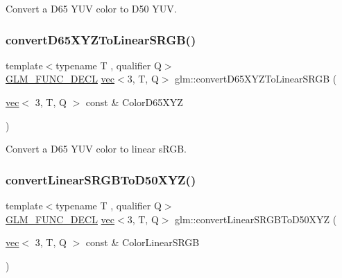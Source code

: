 Convert a D65 Y\+UV color to D50 Y\+UV. 

\mbox{\label{group__gtx__color__encoding_ga5265386fc3ac29e4c580d37ed470859c}} 
\subsubsection{\texorpdfstring{convert\+D65\+X\+Y\+Z\+To\+Linear\+S\+R\+G\+B()}{convertD65XYZToLinearSRGB()}}
{\footnotesize\ttfamily template$<$typename T , qualifier Q$>$ \\
\mbox{\hyperlink{setup_8hpp_ab2d052de21a70539923e9bcbf6e83a51}{G\+L\+M\+\_\+\+F\+U\+N\+C\+\_\+\+D\+E\+CL}} \mbox{\hyperlink{structglm_1_1vec}{vec}}$<$3, T, Q$>$ glm\+::convert\+D65\+X\+Y\+Z\+To\+Linear\+S\+R\+GB (\begin{DoxyParamCaption}\item[{\mbox{\hyperlink{structglm_1_1vec}{vec}}$<$ 3, T, Q $>$ const \&}]{Color\+D65\+X\+YZ }\end{DoxyParamCaption})}



Convert a D65 Y\+UV color to linear s\+R\+GB. 

\mbox{\label{group__gtx__color__encoding_ga1522ba180e3d83d554a734056da031f9}} 
\subsubsection{\texorpdfstring{convert\+Linear\+S\+R\+G\+B\+To\+D50\+X\+Y\+Z()}{convertLinearSRGBToD50XYZ()}}
{\footnotesize\ttfamily template$<$typename T , qualifier Q$>$ \\
\mbox{\hyperlink{setup_8hpp_ab2d052de21a70539923e9bcbf6e83a51}{G\+L\+M\+\_\+\+F\+U\+N\+C\+\_\+\+D\+E\+CL}} \mbox{\hyperlink{structglm_1_1vec}{vec}}$<$3, T, Q$>$ glm\+::convert\+Linear\+S\+R\+G\+B\+To\+D50\+X\+YZ (\begin{DoxyParamCaption}\item[{\mbox{\hyperlink{structglm_1_1vec}{vec}}$<$ 3, T, Q $>$ const \&}]{Color\+Linear\+S\+R\+GB }\end{DoxyParamCaption})}



